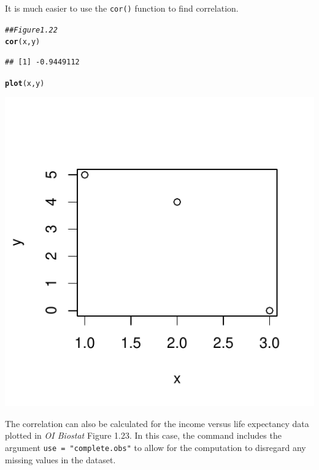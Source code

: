 \documentclass{report}\usepackage[]{graphicx}\usepackage[]{color}
\makeatletter
\def\maxwidth{ %
  \ifdim\Gin@nat@width>\linewidth
    \linewidth
  \else
    \Gin@nat@width
  \fi
}
\newcommand{\hlcom}[1]{\textcolor[rgb]{0.678,0.584,0.686}{\textit{#1}}}%
\newcommand{\hlstd}[1]{\textcolor[rgb]{0.345,0.345,0.345}{#1}}%
\newcommand{\hlkwd}[1]{\textcolor[rgb]{0.737,0.353,0.396}{\textbf{#1}}}%
\newenvironment{kframe}{%
 \def\at@end@of@kframe{}%
 \ifinner\ifhmode%
  \def\at@end@of@kframe{\end{minipage}}%
  \begin{minipage}{\columnwidth}%
 \fi\fi%
 \def\FrameCommand##1{\hskip\@totalleftmargin \hskip-\fboxsep
 \colorbox{shadecolor}{##1}\hskip-\fboxsep
     \hskip-\linewidth \hskip-\@totalleftmargin \hskip\columnwidth}%
 \MakeFramed {\advance\hsize-\width
   \@totalleftmargin\z@ \linewidth\hsize
   \@setminipage}}%
 {\par\unskip\endMakeFramed%
 \at@end@of@kframe}
\newenvironment{knitrout}{}{} %
\makeatother
\begin{document}
It is much easier to use the \texttt{cor()} function to find correlation. 

\begin{knitrout}
\color{fgcolor}\begin{kframe}
\begin{alltt}
\hlcom{## Figure 1.22}
\hlkwd{cor}\hlstd{(x,y)}
\end{alltt}
\begin{verbatim}
## [1] -0.9449112
\end{verbatim}
\begin{alltt}
\hlkwd{plot}\hlstd{(x,y)}
\end{alltt}
\end{kframe}

{\centering \includegraphics[width=\maxwidth]{figure/unnamed-chunk-26-1} 

}



\end{knitrout}

The correlation can also be calculated for the income versus life expectancy data plotted in \textit{OI Biostat} Figure 1.23. In this case, the command includes the argument \texttt{use = "complete.obs"} to allow for the computation to disregard any missing values in the dataset.
\end{document}
